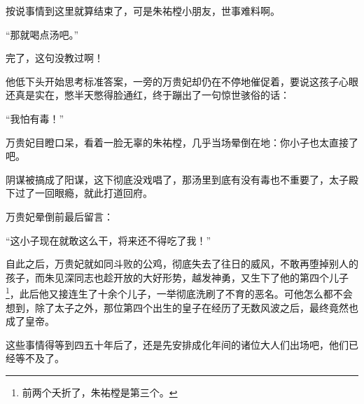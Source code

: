 \begin{multicols}{\theparacolNo}
		按说事情到这里就算结束了，可是朱祐樘小朋友，世事难料啊。

		“那就喝点汤吧。”

		完了，这句没教过啊！

		他低下头开始思考标准答案，一旁的万贵妃却仍在不停地催促着，要说这孩子心眼还真是实在，憋半天憋得脸通红，终于蹦出了一句惊世骇俗的话：

		“我怕有毒！”

		万贵妃目瞪口呆，看着一脸无辜的朱祐樘，几乎当场晕倒在地：你小子也太直接了吧。

		阴谋被搞成了阳谋，这下彻底没戏唱了，那汤里到底有没有毒也不重要了，太子殿下过了一回眼瘾，就此打道回府。

		万贵妃晕倒前最后留言：

		“这小子现在就敢这么干，将来还不得吃了我！”

		自此之后，万贵妃就如同斗败的公鸡，彻底失去了往日的威风，不敢再堕掉别人的孩子，而朱见深同志也趁开放的大好形势，越发神勇，又生下了他的第四个儿子\footnote{前两个夭折了，朱祐樘是第三个。}，此后他又接连生了十余个儿子，一举彻底洗刷了不育的恶名。可他怎么都不会想到，除了太子之外，那位第四个出生的皇子在经历了无数风波之后，最终竟然也成了皇帝。

		这些事情得等到四五十年后了，还是先安排成化年间的诸位大人们出场吧，他们已经等不及了。
		\ifnum{}
	\end{multicols}
\fi
\newpage
